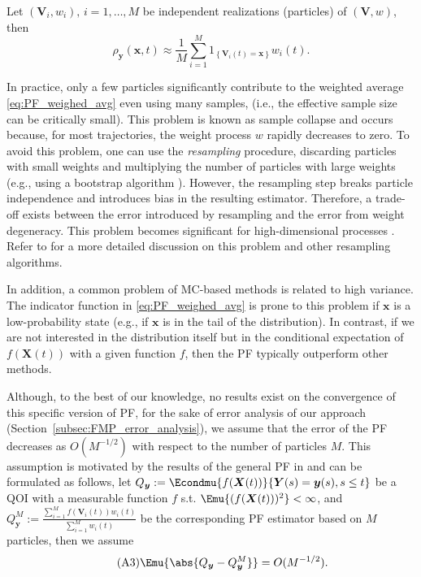 Let $(\boldsymbol{V}_{i}, w_{i}), \, i = 1, \dots, M$ be independent realizations (particles) of $(\boldsymbol{V}, w)$, then 
\begin{equation}
    \label{eq:PF_weighed_avg}
    \rho_{\boldsymbol{y}} (\boldsymbol{x}, t) \approx \frac{1}{M} \sum_{i=1}^{M} 1_{\left\{ \boldsymbol{V}_{i}(t) = \boldsymbol{x} \right\}} w_{i}(t).
\end{equation}

In practice, only a few particles significantly contribute to the weighted average \eqref{eq:PF_weighed_avg} even using many samples, (i.e., the effective sample size can be critically small). This problem is known as sample collapse and occurs because, for most trajectories, the weight process $w$ rapidly decreases to zero. To avoid this problem, one can use the \textit{resampling} procedure, discarding particles with small weights and multiplying the number of particles with large weights (e.g., using a bootstrap algorithm \cite{Gordon1993PF}). However, the resampling step breaks particle independence and introduces bias in the resulting estimator. Therefore, a trade-off exists between the error introduced by resampling and the error from weight degeneracy. This problem becomes significant for high-dimensional processes \cite{Snyder2008HighDimPF, Djuric2013HighDimPF}. Refer to \cite{Bain2009Fundamentals} for a more detailed discussion on this problem and other resampling algorithms. 

In addition, a common problem of \ac{MC}-based methods is related to high variance. The indicator function in \eqref{eq:PF_weighed_avg} is prone to this problem if $\boldsymbol{x}$ is a low-probability state (e.g., if $\boldsymbol{x}$ is in the tail of the distribution). In contrast, if we are not interested in the distribution itself but in the conditional expectation of $f(\boldsymbol{X}(t))$ with a given function $f$, then the \ac{PF} typically outperform other methods.

Although, to the best of our knowledge, no results exist on the convergence of this specific version of \ac{PF}, for the sake of error analysis of our approach (Section~\ref{subsec:FMP_error_analysis}), we assume that the error of the \ac{PF} decreases as $O(M^{-1/2})$ with respect to the number of particles $M$. This assumption is motivated by the results of the general \ac{PF} in \cite{Chopin2004CLTforSeqMC, crisan2002survey} and can be formulated as follows, let $Q_{\boldsymbol{y}} := \Econdmu{f(\boldsymbol{X}(t))}{\boldsymbol{Y}(s) = \boldsymbol{y}(s), s \leq t}$ be a \ac{QOI} with a measurable function $f$ s.t. $\Emu{(f(\boldsymbol{X}(t)))^2} < \infty$, and $Q^{M}_{\boldsymbol{y}} := \frac{ \sum_{i=1}^{M} f(\boldsymbol{V}_i (t)) w_i (t) }{ \sum_{i=1}^{M} w_i (t) }$ be the corresponding \ac{PF} estimator based on $M$ particles, then we assume 
\begin{equation}
\label{eq:PF_error_rate} \tag{A3}
    \Emu { \abs{ Q_{\boldsymbol{y}} - Q_{\boldsymbol{y}}^M } } = O(M^{-1/2}).
\end{equation}







